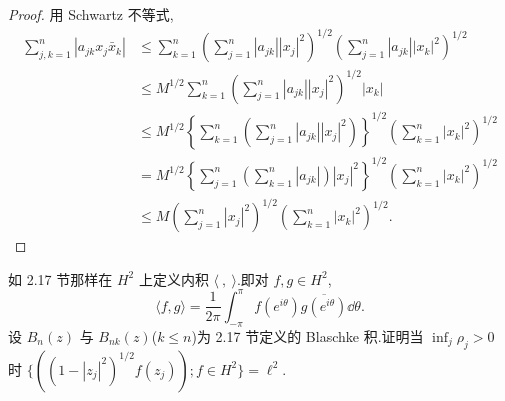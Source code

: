 \begin{proof}
用 Schwartz 不等式,
\begin{align*}
\sum_{j,k=1}^{n}|a_{jk}x_{j}\bar{x}_{k}|&\leq \sum_{k=1}^{n}\left(\sum_{j=1}^{n}|a_{jk}||x_{j}|^{2}\right)^{1/2}\left(\sum_{j=1}^{n}|a_{jk}||x_{k}|^{2}\right)^{1/2}  \\
&\leq M^{1/2}\sum_{k=1}^{n}\left(\sum_{j=1}^{n}|a_{jk}||x_{j}|^{2}\right)^{1/2}|x_{k}| \\
&\leq M^{1/2}\left\{\sum_{k=1}^{n}\left(\sum_{j=1}^{n}|a_{jk}||x_{j}|^{2}\right)\right\}^{1/2}\left(\sum_{k=1}^{n}|x_{k}|^{2}\right)^{1/2} \\
&= M^{1/2}\left\{\sum_{j=1}^{n}\left(\sum_{k=1}^{n}|a_{jk}|\right)|x_{j}|^{2}\right\}^{1/2}\left(\sum_{k=1}^{n}|x_{k}|^{2}\right)^{1/2} \\
&\leq M\left(\sum_{j=1}^{n}|x_{j}|^{2}\right)^{1/2}\left(\sum_{k=1}^{n}|x_{k}|^{2}\right)^{1/2}.
\end{align*}
\end{proof}

如 2.17 节那样在 $H^{2}$ 上定义内积 $\langle\ ,\ \rangle$.即对 $f, g \in H^{2}$,
\begin{equation*}
\langle f, g \rangle = \frac{1}{2\pi}\int_{-\pi}^{\pi} f(e^{i\theta})\overline{g(e^{i\theta})}\dd \theta.
\end{equation*}
设 $B_{n}(z)$ 与 $B_{nk}(z)$($k \leq n$)为 2.17 节定义的 Blaschke 积.证明当 $\inf_{j}\rho_{j} > 0$ 时 $\{((1 - |z_{j}|^{2})^{1/2}f(z_{j})); f \in H^{2}\} = \ell^{2}$.

